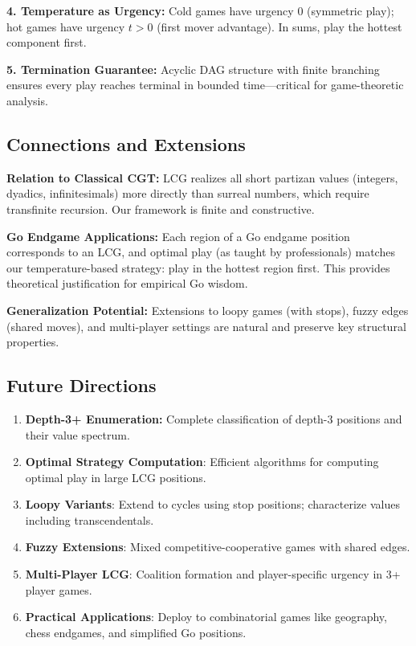 \documentclass[10pt,a4paper,twocolumn]{article}
\theoremstyle{plain}
\theoremstyle{definition}
\theoremstyle{remark}
\begin{document}
\textbf{4. Temperature as Urgency:} Cold games have urgency 0 (symmetric play); hot games have urgency $t > 0$ (first mover advantage). In sums, play the hottest component first.

\textbf{5. Termination Guarantee:} Acyclic DAG structure with finite branching ensures every play reaches terminal in bounded time—critical for game-theoretic analysis.

\subsection{Connections and Extensions}

\textbf{Relation to Classical CGT:} LCG realizes all short partizan values (integers, dyadics, infinitesimals) more directly than surreal numbers, which require transfinite recursion. Our framework is finite and constructive.

\textbf{Go Endgame Applications:} Each region of a Go endgame position corresponds to an LCG, and optimal play (as taught by professionals) matches our temperature-based strategy: play in the hottest region first. This provides theoretical justification for empirical Go wisdom.

\textbf{Generalization Potential:} Extensions to loopy games (with stops), fuzzy edges (shared moves), and multi-player settings are natural and preserve key structural properties.

\subsection{Future Directions}

\begin{enumerate}
\item \textbf{Depth-3+ Enumeration:} Complete classification of depth-3 positions and their value spectrum.
\item \textbf{Optimal Strategy Computation}: Efficient algorithms for computing optimal play in large LCG positions.
\item \textbf{Loopy Variants}: Extend to cycles using stop positions; characterize values including transcendentals.
\item \textbf{Fuzzy Extensions}: Mixed competitive-cooperative games with shared edges.
\item \textbf{Multi-Player LCG}: Coalition formation and player-specific urgency in 3+ player games.
\item \textbf{Practical Applications}: Deploy to combinatorial games like geography, chess endgames, and simplified Go positions.
\end{enumerate}
\end{document}
